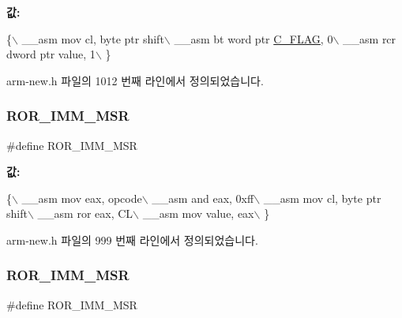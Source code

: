 {\bfseries 값\+:}
\begin{DoxyCode}
\{\(\backslash\)
        \_\_asm mov cl, byte ptr shift\(\backslash\)
        \_\_asm bt word ptr \mbox{\hyperlink{_g_b_8h_aa29c80f7f7f901ec7a2c57887f56585d}{C\_FLAG}}, 0\(\backslash\)
        \_\_asm rcr dword ptr value, 1\(\backslash\)
      \}
\end{DoxyCode}


arm-\/new.\+h 파일의 1012 번째 라인에서 정의되었습니다.

\mbox{\label{arm-new_8h_a03315661c577ffd748ff9c2f2ad24b96}} 
\subsubsection{\texorpdfstring{R\+O\+R\+\_\+\+I\+M\+M\+\_\+\+M\+SR}{ROR\_IMM\_MSR}\hspace{0.1cm}{\footnotesize\ttfamily [1/2]}}
{\footnotesize\ttfamily \#define R\+O\+R\+\_\+\+I\+M\+M\+\_\+\+M\+SR}

{\bfseries 값\+:}
\begin{DoxyCode}
\{\(\backslash\)
        \_\_asm mov eax, opcode\(\backslash\)
        \_\_asm and eax, 0xff\(\backslash\)
        \_\_asm mov cl, byte ptr shift\(\backslash\)
        \_\_asm ror eax, CL\(\backslash\)
        \_\_asm mov value, eax\(\backslash\)
      \}
\end{DoxyCode}


arm-\/new.\+h 파일의 999 번째 라인에서 정의되었습니다.

\mbox{\label{_g_b_a_8cpp_a03315661c577ffd748ff9c2f2ad24b96}} 
\subsubsection{\texorpdfstring{R\+O\+R\+\_\+\+I\+M\+M\+\_\+\+M\+SR}{ROR\_IMM\_MSR}\hspace{0.1cm}{\footnotesize\ttfamily [2/2]}}
{\footnotesize\ttfamily \#define R\+O\+R\+\_\+\+I\+M\+M\+\_\+\+M\+SR}

